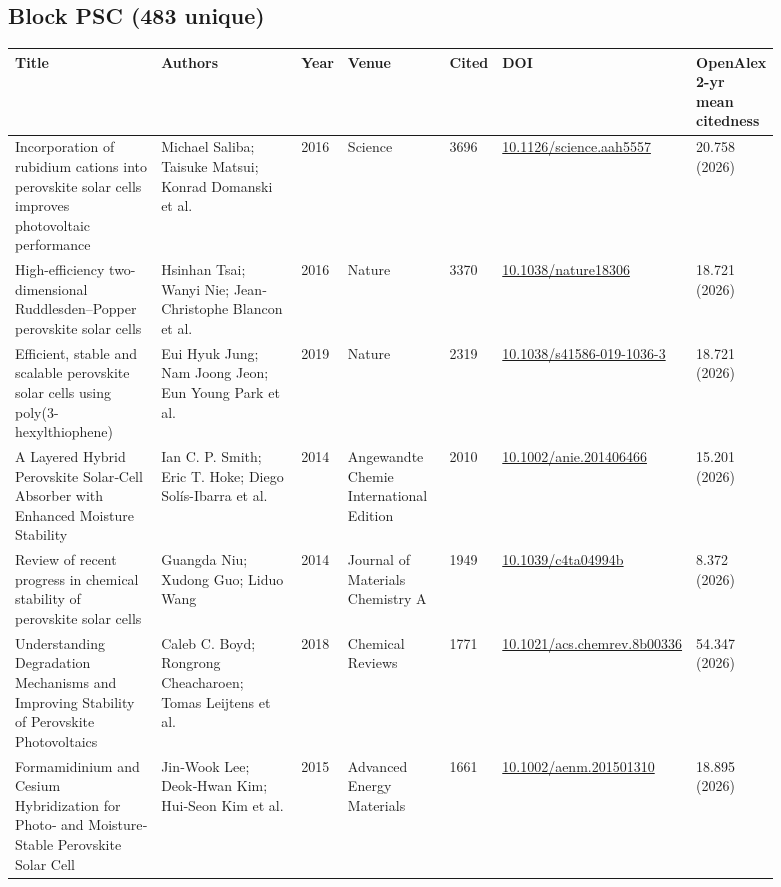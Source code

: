 \documentclass[10pt,a4paper]{article}
\begin{document}
\subsection*{Block PSC (483 unique)}
{\scriptsize\begin{longtable}{p{0.220\linewidth}p{0.220\linewidth}p{0.044\linewidth}p{0.148\linewidth}p{0.044\linewidth}p{0.107\linewidth}p{0.110\linewidth}}
\hline
\textbf{Title} & \textbf{Authors} & \textbf{Year} & \textbf{Venue} & \textbf{Cited} & \textbf{DOI} & \textbf{OpenAlex 2-yr mean citedness} \\ \hline
\endhead
Incorporation of rubidium cations into perovskite solar cells improves photovoltaic performance & Michael Saliba; Taisuke Matsui; Konrad Domanski et al. & 2016 & Science & 3696 & \href{https://doi.org/10.1126/science.aah5557}{10.1126/science.aah5557} & 20.758 (2026) \\
High-efficiency two-dimensional Ruddlesden–Popper perovskite solar cells & Hsinhan Tsai; Wanyi Nie; Jean‐Christophe Blancon et al. & 2016 & Nature & 3370 & \href{https://doi.org/10.1038/nature18306}{10.1038/nature18306} & 18.721 (2026) \\
Efficient, stable and scalable perovskite solar cells using poly(3-hexylthiophene) & Eui Hyuk Jung; Nam Joong Jeon; Eun Young Park et al. & 2019 & Nature & 2319 & \href{https://doi.org/10.1038/s41586-019-1036-3}{10.1038/s41586-019-1036-3} & 18.721 (2026) \\
A Layered Hybrid Perovskite Solar‐Cell Absorber with Enhanced Moisture Stability & Ian C. P. Smith; Eric T. Hoke; Diego Solís-Ibarra et al. & 2014 & Angewandte Chemie International Edition & 2010 & \href{https://doi.org/10.1002/anie.201406466}{10.1002/anie.201406466} & 15.201 (2026) \\
Review of recent progress in chemical stability of perovskite solar cells & Guangda Niu; Xudong Guo; Liduo Wang & 2014 & Journal of Materials Chemistry A & 1949 & \href{https://doi.org/10.1039/c4ta04994b}{10.1039/c4ta04994b} & 8.372 (2026) \\
Understanding Degradation Mechanisms and Improving Stability of Perovskite Photovoltaics & Caleb C. Boyd; Rongrong Cheacharoen; Tomas Leijtens et al. & 2018 & Chemical Reviews & 1771 & \href{https://doi.org/10.1021/acs.chemrev.8b00336}{10.1021/acs.chemrev.8b00336} & 54.347 (2026) \\
Formamidinium and Cesium Hybridization for Photo‐ and Moisture‐Stable Perovskite Solar Cell & Jin‐Wook Lee; Deok‐Hwan Kim; Hui‐Seon Kim et al. & 2015 & Advanced Energy Materials & 1661 & \href{https://doi.org/10.1002/aenm.201501310}{10.1002/aenm.201501310} & 18.895 (2026) \\

\end{longtable}}
\end{document}
